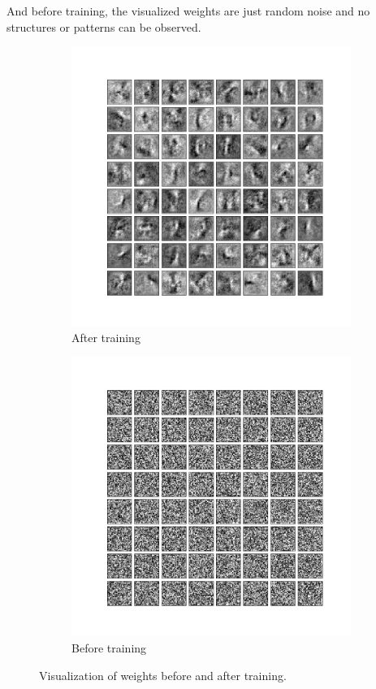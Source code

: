 \documentclass[11pt]{article}
\begin{document}
And before training, the visualized weights are just random noise and no structures or patterns can be observed.

\begin{figure}[h!]
    \begin{subfigure}{.495\textwidth}
      \centering
      \includegraphics[width=.95\linewidth]{../results/q3_1_3a.png}
      \caption{After training}
    \end{subfigure}
    \begin{subfigure}{.495\textwidth}
      \centering
      \includegraphics[width=.95\linewidth]{../results/q3_1_3b.png}
      \caption{Before training}
    \end{subfigure}\hfill
    \caption{Visualization of weights before and after training. }
    \label{fig:q3.1.3}
\end{figure}
\end{document}
